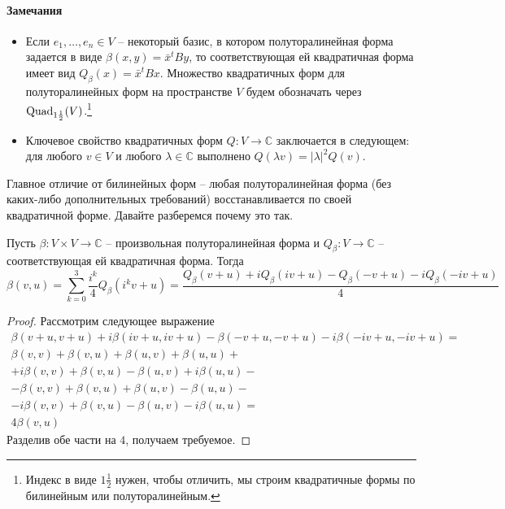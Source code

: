 \paragraph{Замечания}
\begin{itemize}

\item Если $e_1,\ldots,e_n\in V$ -- некоторый базис, в котором полуторалинейная форма задается в виде $\beta(x, y) = \bar x^t B y$, то соответствующая ей квадратичная форма имеет вид $Q_\beta(x) = \bar x^t B x$. Множество квадратичных форм для полуторалинейных форм на пространстве $V$ будем обозначать через $\operatorname{Quad}_{1\frac{1}{2}}(V)$.\footnote{Индекс в виде $1\frac{1}{2}$ нужен, чтобы отличить, мы строим квадратичные формы по билинейным или полуторалинейным.}

\item Ключевое свойство квадратичных форм $Q\colon V\to \mathbb C$ заключается в следующем: для любого $v\in V$ и любого $\lambda\in \mathbb C$ выполнено $Q(\lambda v) = |\lambda|^2Q(v)$.
\end{itemize}

Главное отличие от билинейных форм -- любая полуторалинейная форма (без каких-либо дополнительных требований) восстанавливается по своей квадратичной форме. Давайте разберемся почему это так.

\begin{claim}\label{claim::CPolarization}
Пусть $\beta\colon V\times V\to \mathbb C$ -- произвольная полуторалинейная форма и $Q_\beta\colon V\to \mathbb C$ -- соответствующая ей квадратичная форма. Тогда 
\[
\beta(v, u) = \sum_{k=0}^3 \frac{i^k}{4}Q_\beta\left(i^k v + u\right) = \frac{Q_\beta(v+u) + iQ_\beta(iv+u) - Q_\beta(-v + u) -i Q_\beta(-iv+u)}{4}
\]
\end{claim}
\begin{proof}
Рассмотрим следующее выражение
\begin{gather*}
\beta(v + u, v+ u) + i\beta(iv + u, iv+ u) - \beta(-v + u, -v+ u) -i \beta(-iv + u, -iv+ u)=\\
\beta(v,v)+\beta(v,u)+\beta(u,v)+\beta(u,u)+\\
+i\beta(v,v)+\beta(v,u)-\beta(u,v)+i\beta(u,u)-\\
-\beta(v,v)+\beta(v,u)+\beta(u,v)-\beta(u,u)-\\
-i\beta(v,v)+\beta(v,u)-\beta(u,v)-i\beta(u,u)=\\
4 \beta(v, u)
\end{gather*}
Разделив обе части на $4$, получаем требуемое.
\end{proof}

